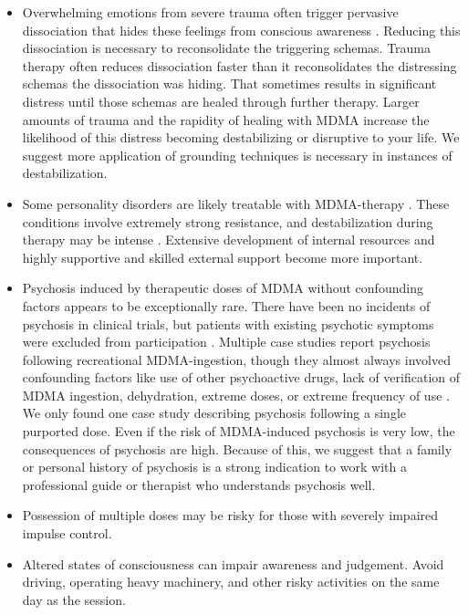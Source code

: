 \documentclass[12pt,letterpaper]{article}
\begin{document}
\begin{itemize}
    \item Overwhelming emotions from severe trauma often trigger pervasive dissociation that hides these feelings from conscious awareness \cite{razviPSIP}. Reducing this dissociation is necessary to reconsolidate the triggering schemas. Trauma therapy often reduces dissociation faster than it reconsolidates the distressing schemas the dissociation was hiding. That sometimes results in significant distress until those schemas are healed through further therapy. Larger amounts of trauma and the rapidity of healing with MDMA increase the likelihood of this distress becoming destabilizing or disruptive to your life. We suggest more application of grounding techniques is necessary in instances of destabilization.  
    \item Some personality disorders are likely treatable with MDMA-therapy \cite{traynorBorderline}. These conditions involve extremely strong resistance, and destabilization during therapy may be intense \cite{razviPSIP}. Extensive development of internal resources and highly supportive and skilled external support become more important.
    \item Psychosis induced by therapeutic doses of MDMA without confounding factors appears to be exceptionally rare. There have been no incidents of psychosis in clinical trials, but patients with existing psychotic symptoms were excluded from participation \cite{smithSystematic,mitchellMDMAClinicalTrial2}. Multiple case studies report psychosis following recreational MDMA-ingestion, though they almost always involved confounding factors like use of other psychoactive drugs, lack of verification of MDMA ingestion, dehydration, extreme doses, or extreme frequency of use \cite{mcguirePsychosis,patelPsychosis,vaivaPsychosis}. We only found one case study describing psychosis following a single purported dose. Even if the risk of MDMA-induced psychosis is very low, the consequences of psychosis are high. Because of this, we suggest that a family or personal history of psychosis is a strong indication to work with a professional guide or therapist who understands psychosis well.
    \item Possession of multiple doses may be risky for those with severely impaired impulse control.
    \item Altered states of consciousness can impair awareness and judgement. Avoid driving, operating heavy machinery, and other risky activities on the same day as the session.
\end{itemize}
\end{document}

